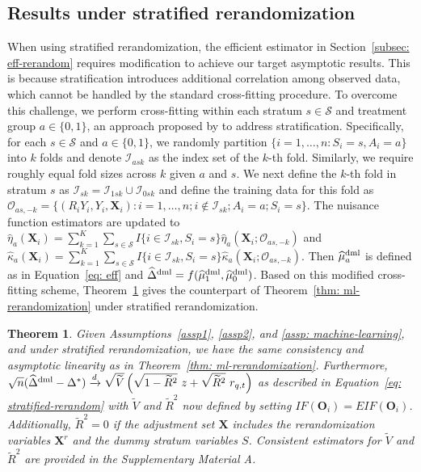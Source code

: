 \documentclass[12pt]{article}
\newtheorem{theorem}{Theorem}
\newcommand{\bX}{\boldsymbol{X}}\newcommand{\bO}{\boldsymbol{O}}
\begin{document}
{\subsection{Results under stratified rerandomization}
When using stratified rerandomization, the efficient estimator in Section~\ref{subsec: eff-rerandom} requires modification to achieve our target asymptotic results. This is because stratification introduces additional correlation among observed data, which cannot be handled by the standard cross-fitting procedure. To overcome this challenge, we perform cross-fitting within each stratum $s \in \mathcal{S}$ and treatment group $a \in \{0,1\}$, an approach proposed by \cite{rafi2023efficient} to address stratification. 
Specifically, for each $s \in \mathcal{S}$ and $a \in \{0,1\}$, we randomly partition $\{i=1,\dots, n: S_i=s, A_i=a\}$ into $k$ folds and denote $\mathcal{I}_{ask}$ as the index set of the $k$-th fold. Similarly, we require roughly equal fold sizes across $k$ given $a$ and $s$. We next define the $k$-th fold in stratum $s$ as $\mathcal{I}_{sk} = \mathcal{I}_{1sk} \cup \mathcal{I}_{0sk}$ and define the training data for this fold as $\mathcal{O}_{as,-k} = \{(R_iY_i,Y_i,\bX_i): i = 1,\dots, n;i \notin \mathcal{I}_{sk}; A_i =a;S_i=s\}$. The nuisance function estimators are updated to $\widehat{\eta}_a(\bX_i) = \sum_{k=1}^K \sum_{s\in \mathcal{S}} I\{i \in \mathcal{I}_{sk}, S_i=s\}\widehat{\eta}_a(\bX_i;\mathcal{O}_{as,-k})$ and $\widehat{\kappa}_a(\bX_i) = \sum_{k=1}^K \sum_{s\in \mathcal{S}} I\{i \in \mathcal{I}_{sk}, S_i=s\}\widehat{\kappa}_a(\bX_i;\mathcal{O}_{as,-k})$. Then $\widehat{\mu}_a^{\textup{dml}}$ is defined as in Equation~\eqref{eq: eff} and $\widehat{\Delta}^{\textup{dml}} = f(\widehat{\mu}_1^{\textup{dml}}, \widehat{\mu}_0^{\textup{dml}})$. 
Based on this modified cross-fitting scheme, Theorem~\ref{thm: ml-stratified-rerandom} gives the counterpart of Theorem~\ref{thm: ml-rerandomization} under stratified rerandomization.

\begin{theorem}\label{thm: ml-stratified-rerandom}
Given Assumptions~\ref{assp1}, \ref{assp2}, and \ref{assp: machine-learning}, and under stratified rerandomization, we have the same consistency and asymptotic linearity as in Theorem~\ref{thm: ml-rerandomization}. Furthermore, $\sqrt{n}(\widehat{\Delta}^{\textup{dml}}-\Delta^*) \xrightarrow{d} \sqrt{\widetilde{V}}\left(\sqrt{1-\widetilde{R}^2}\ z + \sqrt{\widetilde{R}^2}\ r_{q,t}\right)$ as described in Equation~\eqref{eq: stratified-rerandom} with $\widetilde{V}$ and $\widetilde{R}^2$ now defined by setting $IF(\bO_i)=EIF(\bO_i)$. Additionally, $\widetilde{R}^2=0$ if the adjustment set $\bX$ includes the rerandomization variables $\bX^r$ and the dummy stratum variables $S$. Consistent estimators for $\widetilde{V}$ and $\widetilde{R}^2$ are provided in the Supplementary Material A.
\end{theorem}


}
\end{document}

